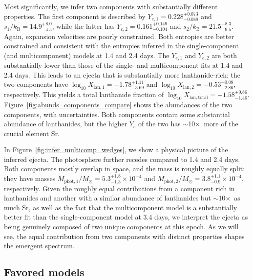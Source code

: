 \documentclass[twocolumn,twocolappendix]{aastex63}
\begin{document}
{{{{{{Most significantly, we infer two components with substantially different properties. The first component is described by $Y_{e,1} = 0.228^{+0.073}_{-0.088}$ and $s_1 / k_{\mathrm{B}} = 14.9^{+8.0}_{-4.5}$, while the latter has $Y_{e,2} = 0.161^{+0.149}_{-0.104}$ and $s_2 / k_{\mathrm{B}} = 21.5^{+8.3}_{-9.5}$. Again, expansion velocities are poorly constrained. Both entropies are better constrained and consistent with the entropies inferred in the single-component (and multicomponent) models at 1.4 and 2.4 days. The $Y_{e,1}$ and $Y_{e,2}$ are both substantially lower than those of the single- and multicomponent fits at 1.4 and 2.4 days. This leads to an ejecta that is substantially more lanthanide-rich: the two components have $\log_{10} X_{\mathrm{lan},1} = -1.78^{+1.11}_{-3.69}$ and $\log_{10} X_{\mathrm{lan},2} = -0.53^{+0.08}_{-2.86}$, respectively. This yields a total lanthanide fraction of $\log_{10} X_{\mathrm{lan,total}} = -1.58^{+0.86}_{-1.46}$. Figure~\ref{fig:abunds_components_compare} shows the abundances of the two components, with uncertainties. Both components contain some substantial abundance of lanthanides, but the higher $Y_e$ of the two has $\sim$10$\times$~more of the crucial element Sr.

In Figure~\ref{fig:infer_multicomp_wedges}, we show a physical picture of the inferred ejecta. The photosphere further recedes compared to 1.4 and 2.4 days. Both components mostly overlap in space, and the mass is roughly equally split: they have  masses $M_{\mathrm{phot},1}/M_{\odot} = 5.3^{+1.8}_{-1.3} \times 10^{-4}$ and $M_{\mathrm{phot},2}/M_{\odot} = 3.8^{+1.1}_{-0.9} \times 10^{-4}$, respectively. Given the roughly equal contributions from a component rich in lanthanides and another with a similar abundance of lanthanides but $\sim$10$\times$~as much Sr, as well as the fact that the multicomponent model is a substantially better fit than the single-component model at 3.4 days, we interpret the ejecta as being genuinely composed of two unique components at this epoch. As we will see, the equal contribution from two components with distinct properties shapes the emergent spectrum. 





\subsection{Favored models}\label{ssc:favored}

}}}}}}
\end{document}
